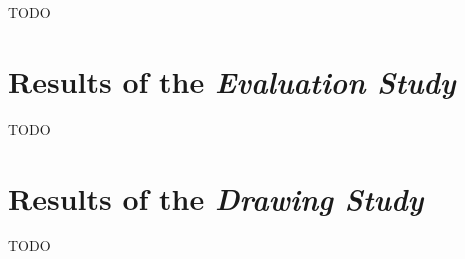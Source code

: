 TODO

\section{Results of the \textit{Evaluation Study}}
TODO

\section{Results of the \textit{Drawing Study}}
TODO